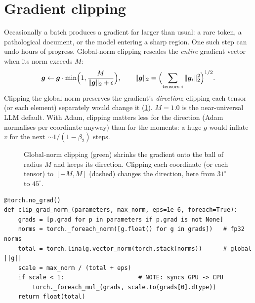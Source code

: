 \section{Gradient clipping}\label{sec:optim:clip}

Occasionally a batch produces a gradient far larger than usual: a rare token, a pathological
document, or the model entering a sharp region. One such step can undo hours of progress.
Global-norm clipping rescales the \emph{entire} gradient vector when its norm exceeds $M$:
\begin{equation}
\bm{g} \leftarrow \bm{g}\cdot\min\Bigl(1, \frac{M}{\|\bm{g}\|_2+\epsilon}\Bigr),
\qquad \|\bm{g}\|_2 = \Bigl(\sum_{\text{tensors }i}\|\bm{g}_i\|_2^2\Bigr)^{1/2}.
\label{eq:optim:clip}
\end{equation}
Clipping the global norm preserves the gradient's \emph{direction}; clipping each tensor (or
each element) separately would change it (\cref{fig:optim:clip}). $M=1.0$ is the near-universal
LLM default. With Adam, clipping matters less for the direction (Adam normalises per coordinate
anyway) than for the moments: a huge $g$ would inflate $v$ for the next $\sim 1/(1-\beta_2)$
steps.

\begin{figure}[t]
\centering
{}
\caption{Global-norm clipping (green) shrinks the gradient onto the ball of radius $M$ and keeps
its direction. Clipping each coordinate (or each tensor) to $[-M,M]$ (dashed) changes the
direction, here from $31^\circ$ to $45^\circ$.}
\label{fig:optim:clip}
\end{figure}

\begin{lstlisting}[caption={Global-norm clipping with multi-tensor kernels. It returns the \emph{pre-clip} norm, the single most useful scalar to log.},label={lst:optim:clipcode}]
@torch.no_grad()
def clip_grad_norm_(parameters, max_norm, eps=1e-6, foreach=True):
    grads = [p.grad for p in parameters if p.grad is not None]
    norms = torch._foreach_norm([g.float() for g in grads])   # fp32 norms
    total = torch.linalg.vector_norm(torch.stack(norms))      # global ||g||
    scale = max_norm / (total + eps)
    if scale < 1:                     # NOTE: syncs GPU -> CPU
        torch._foreach_mul_(grads, scale.to(grads[0].dtype))
    return float(total)
\end{lstlisting}

